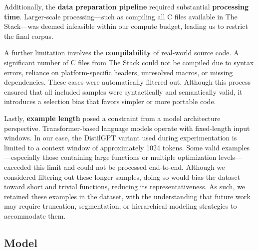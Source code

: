 \documentclass[../main.tex]{subfiles}
\begin{document}
Additionally, the \textbf{data preparation pipeline} required substantial \textbf{processing time}. Larger-scale processing---such as compiling all C files available in The Stack---was deemed infeasible within our compute budget, leading us to restrict the final corpus.

A further limitation involves the \textbf{compilability} of real-world source code. A significant number of C files from The Stack could not be compiled due to syntax errors, reliance on platform-specific headers, unresolved macros, or missing dependencies. These cases were automatically filtered out. Although this process ensured that all included samples were syntactically and semantically valid, it introduces a selection bias that favors simpler or more portable code.

Lastly, \textbf{example length} posed a constraint from a model architecture perspective. Transformer-based language models operate with fixed-length input windows. In our case, the DistilGPT \cite{sanh2019distilbert} variant used during experimentation is limited to a context window of approximately 1024 tokens. Some valid examples---especially those containing large functions or multiple optimization levels---exceeded this limit and could not be processed end-to-end. Although we considered filtering out these longer samples, doing so would bias the dataset toward short and trivial functions, reducing its representativeness. As such, we retained these examples in the dataset, with the understanding that future work may require truncation, segmentation, or hierarchical modeling strategies to accommodate them.

\subsection{Model}
\end{document}
